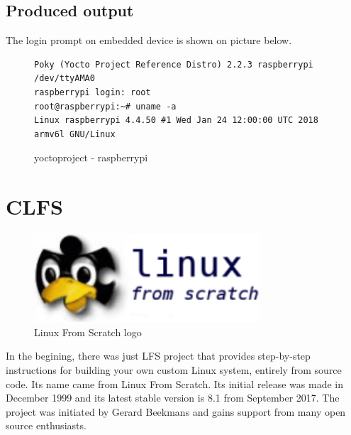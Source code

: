 \documentclass[printmode]{mgr}
\begin{document}
\subsection*{Produced output}
The login prompt on embedded device is shown on picture below.


\begin{figure}
    \centering
\begin{verbatim}
Poky (Yocto Project Reference Distro) 2.2.3 raspberrypi /dev/ttyAMA0
raspberrypi login: root
root@raspberrypi:~# uname -a
Linux raspberrypi 4.4.50 #1 Wed Jan 24 12:00:00 UTC 2018 armv6l GNU/Linux
\end{verbatim}
    \caption{yoctoproject - raspberrypi}
\end{figure}







\section{CLFS}

\begin{figure}[htbp]
  \centering
    \includegraphics[width=0.75\textwidth]{lfs-logo.png}
    \caption{Linux From Scratch logo}
  \label{fig:lfs-logo}
\end{figure}


In the begining, there was just LFS project that provides step-by-step instructions for building your own custom Linux system, entirely from source code.
Its name came from Linux From Scratch.
Its initial release was made in December 1999 and its latest stable version is 8.1 from September 2017. The project was initiated by Gerard Beekmans and gains support from many open source enthusiasts.
\end{document}
